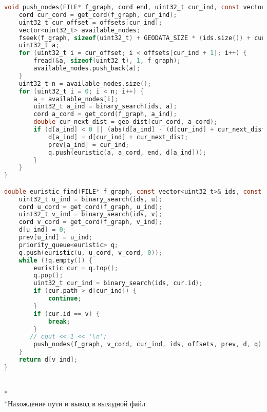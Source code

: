 \begin{lstlisting}[language=C]
void push_nodes(FILE* f_graph, cord end, uint32_t cur_ind, const vector<uint32_t>& ids, const vector<uint32_t>& offsets, vector<uint32_t>& prev, vector<double>& d, priority_queue<euristic>& q) {
    cord cur_cord = get_cord(f_graph, cur_ind);
    uint32_t cur_offset = offsets[cur_ind];
    vector<uint32_t> available_nodes;
    fseek(f_graph, sizeof(uint32_t) + GEODATA_SIZE * (ids.size()) + cur_offset * sizeof(uint32_t), 0);
    uint32_t a;
    for (uint32_t i = cur_offset; i < offsets[cur_ind + 1]; i++) {
        fread(&a, sizeof(uint32_t), 1, f_graph);
        available_nodes.push_back(a);
    }
    uint32_t n = available_nodes.size();
    for (uint32_t i = 0; i < n; i++) {
        a = available_nodes[i];
        uint32_t a_ind = binary_search(ids, a);
        cord a_cord = get_cord(f_graph, a_ind);
        double cur_next_dist = geo_dist(cur_cord, a_cord);
        if (d[a_ind] < 0 || (abs(d[a_ind] - (d[cur_ind] + cur_next_dist)) > EPS && d[a_ind] > d[cur_ind] + cur_next_dist)) {
            d[a_ind] = d[cur_ind] + cur_next_dist;
            prev[a_ind] = cur_ind;
            q.push(euristic(a, a_cord, end, d[a_ind]));
        }
    }
}

double euristic_find(FILE* f_graph, const vector<uint32_t>& ids, const vector<uint32_t>& offsets, const uint32_t& u, const uint32_t& v, vector<uint32_t>& prev, vector<double>& d) {
    uint32_t u_ind = binary_search(ids, u);
    cord u_cord = get_cord(f_graph, u_ind);
    uint32_t v_ind = binary_search(ids, v);
    cord v_cord = get_cord(f_graph, v_ind);
    d[u_ind] = 0;
    prev[u_ind] = u_ind;
    priority_queue<euristic> q;
    q.push(euristic(u, u_cord, v_cord, 0));
    while (!q.empty()) {
        euristic cur = q.top();
        q.pop();
        uint32_t cur_ind = binary_search(ids, cur.id);
        if (cur.path > d[cur_ind]) {
            continue;
        }
        if (cur.id == v) {
            break;
        }
       // cout << 1 << '\n';
        push_nodes(f_graph, v_cord, cur_ind, ids, offsets, prev, d, q);
    }
    return d[v_ind];
}
\end{lstlisting}

\\*\\*Нахождение пути и вывод в выходной файл

